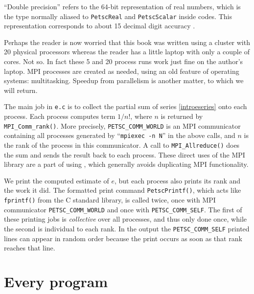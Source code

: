 ``Double precision'' refers to the 64-bit representation of real numbers, which is the type normally aliased to \texttt{PetscReal} and \texttt{PetscScalar} inside \PETSc codes.  This representation corresponds to about 15 decimal digit accuracy \citep{TrefethenBau}.


Perhaps the reader is now worried that this book was written using a cluster with 20 physical processors whereas the reader has a little laptop with only a couple of cores.  Not so.  In fact these 5 and 20 process runs work just fine on the author's laptop.  MPI processes are created as needed, using an old feature of operating systems: multitasking.  Speedup from parallelism is another matter, to which we will return.

The main job in \texttt{e.c} is to collect the partial sum of series \eqref{introeseries} onto each process.  Each process computes term $1/n!$, where $n$ is returned by \texttt{MPI\_Comm\_rank()}.  More precisely, \texttt{PETSC\_COMM\_WORLD} is an MPI communicator \citep{Groppetal1999} containing all processes generated by ``\texttt{mpiexec -n N}'' in the above calls, and $n$ is the rank of the process in this communicator.  A call to \texttt{MPI\_Allreduce()} does the sum and sends the result back to each process.  These direct uses of the MPI library are a part of using \PETSc, which generally avoids duplicating MPI functionality.

We print the computed estimate of $e$, but each process also prints its rank and the work it did.  The formatted print command \texttt{PetscPrintf()}, which acts like \texttt{fprintf()} from the C standard library, is called twice, once with MPI communicator \texttt{PETSC\_COMM\_WORLD} and once with \texttt{PETSC\_COMM\_SELF}.  The first of these printing jobs is \emph{collective} over all processes, and thus only done once, while the second is individual to each rank.  In the output the \texttt{PETSC\_COMM\_SELF} printed lines can appear in random order because the print occurs as soon as that rank reaches that line.

\section{Every \PETSc program}

